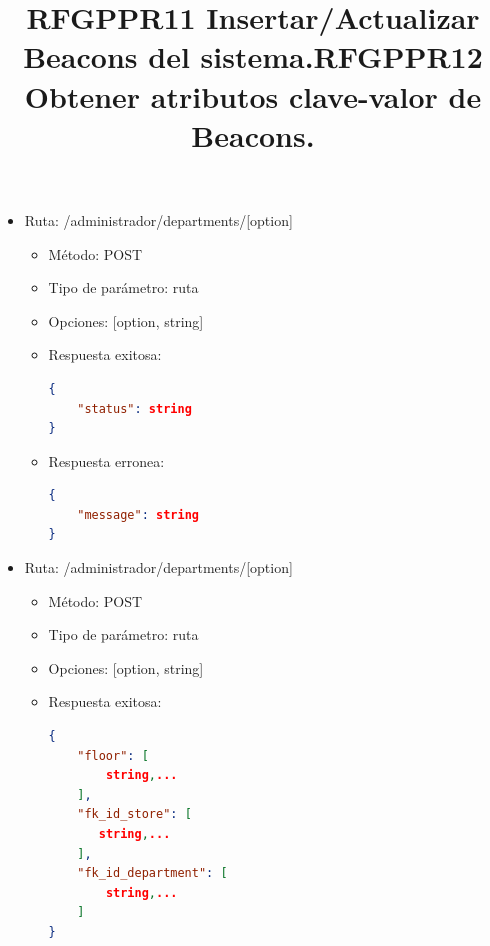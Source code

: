 \title{\textbf{RFGPPR11 Insertar/Actualizar Beacons del sistema.}}
\begin{itemize}
\item Ruta: /administrador/departments/[option]
\begin{itemize}
\item Método: POST
\item Tipo de parámetro: ruta
\item Opciones: [option, string] 
\item Respuesta exitosa: 
\begin{lstlisting}[language=json,firstnumber=1]
{
	"status": string
}
\end{lstlisting}
\item Respuesta erronea: 
\begin{lstlisting}[language=json,firstnumber=1]
{
	"message": string 
}
\end{lstlisting}
\end{itemize}
\end{itemize}

\title{\textbf{RFGPPR12 Obtener atributos clave-valor de Beacons.}}
\begin{itemize}
\item Ruta: /administrador/departments/[option]
\begin{itemize}
\item Método: POST
\item Tipo de parámetro: ruta
\item Opciones: [option, string] 
\item Respuesta exitosa: 
\begin{lstlisting}[language=json,firstnumber=1]
{
    "floor": [
		string,...
    ],
    "fk_id_store": [
       string,...
    ],
    "fk_id_department": [
        string,...
    ]
}
\end{lstlisting}
\end{itemize}
\end{itemize}


